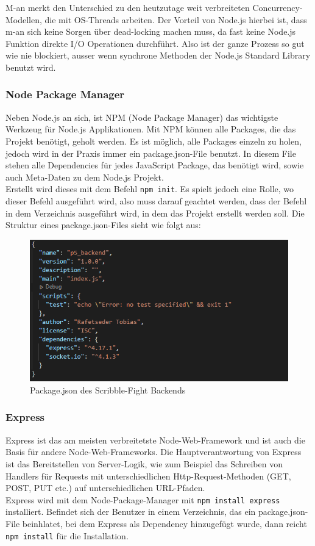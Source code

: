 M-an merkt den Unterschied zu den heutzutage weit verbreiteten Concurrency-Modellen, die mit OS-Threads arbeiten. Der Vorteil von Node.js hierbei ist, dass
m-an sich keine Sorgen über dead-locking machen muss, da fast keine Node.js Funktion direkte I/O Operationen durchführt. Also ist der ganze Prozess so gut wie nie blockiert, ausser
wenn synchrone Methoden der Node.js Standard Library benutzt wird.

\subsubsection{Node Package Manager}\label{NPM}
Neben Node.js an sich, ist NPM (Node Package Manager) das wichtigste Werkzeug für Node.js Applikationen. Mit NPM können alle Packages, die das Projekt benötigt, geholt werden.
Es ist möglich, alle Packages einzeln zu holen, jedoch wird in der Praxis immer ein package.json-File benutzt. In diesem File stehen alle Dependencies für jedes JavaScript Package,
das benötigt wird, sowie auch Meta-Daten zu dem Node.js Projekt. \cite{node_environment}  \\
Erstellt wird dieses mit dem Befehl \texttt{npm init}. Es spielt jedoch eine Rolle, wo dieser Befehl ausgeführt wird, also muss darauf geachtet werden, dass der Befehl in dem Verzeichnis ausgeführt wird, in dem das Projekt erstellt werden soll.
Die Struktur eines package.json-Files sieht wie folgt aus:
\begin{figure}[H]
  \centering
  \includegraphics[scale=1]{pics/package json.PNG}
  \caption{Package.json des Scribble-Fight Backends}
\end{figure}

\subsubsection{Express}
Express ist das am meisten verbreitetste Node-Web-Framework und ist auch die Basis für andere Node-Web-Frameworks. Die Hauptverantwortung
von Express ist das Bereitstellen von Server-Logik, wie zum Beispiel das Schreiben von Handlers für Requests mit unterschiedlichen Http-Request-Methoden (GET, POST, PUT etc.) auf unterschiedlichen URL-Pfaden. \cite{node_environment} \\
Express wird mit dem Node-Package-Manager mit \texttt{npm install express} installiert. Befindet sich der Benutzer in
einem Verzeichnis, das ein package.json-File beinhlatet, bei dem Express als Dependency hinzugefügt wurde, dann reicht \texttt{npm install} für die Installation.

